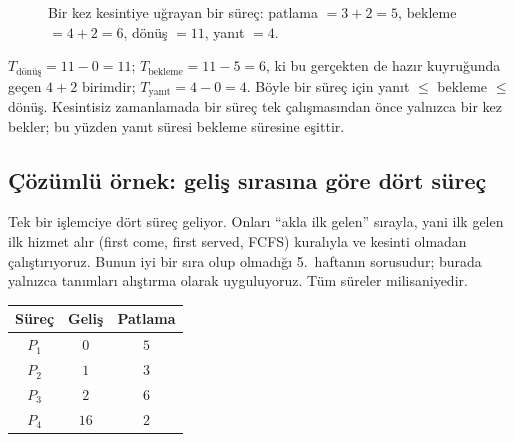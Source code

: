 \documentclass[11pt,a4paper]{article}
\begin{document}
\begin{figure}[H]
\centering
{}
\caption{Bir kez kesintiye uğrayan bir süreç: patlama $=3+2=5$, bekleme $=4+2=6$, dönüş $=11$, yanıt $=4$.}
\end{figure}

\begin{example}
$T_{\text{dönüş}} = 11 - 0 = 11$; $T_{\text{bekleme}} = 11 - 5 = 6$, ki bu gerçekten de hazır kuyruğunda geçen $4 + 2$ birimdir; $T_{\text{yanıt}} = 4 - 0 = 4$. Böyle bir süreç için yanıt $\le$ bekleme $\le$ dönüş. Kesintisiz zamanlamada bir süreç tek çalışmasından önce yalnızca bir kez bekler; bu yüzden yanıt süresi bekleme süresine eşittir.
\end{example}

\subsection{Çözümlü örnek: geliş sırasına göre dört süreç}

Tek bir işlemciye dört süreç geliyor. Onları ``akla ilk gelen'' sırayla, yani ilk gelen ilk hizmet alır (first come, first served, FCFS) kuralıyla ve kesinti olmadan çalıştırıyoruz. Bunun iyi bir sıra olup olmadığı 5.~haftanın sorusudur; burada yalnızca tanımları alıştırma olarak uyguluyoruz. Tüm süreler milisaniyedir.

\begin{center}
\renewcommand{\arraystretch}{1.2}
\begin{tabular}{@{}ccc@{}}
\toprule
\textbf{Süreç} & \textbf{Geliş} & \textbf{Patlama} \\
\midrule
$P_1$ & $0$ & $5$ \\
$P_2$ & $1$ & $3$ \\
$P_3$ & $2$ & $6$ \\
$P_4$ & $16$ & $2$ \\
\bottomrule
\end{tabular}
\end{center}
\end{document}
